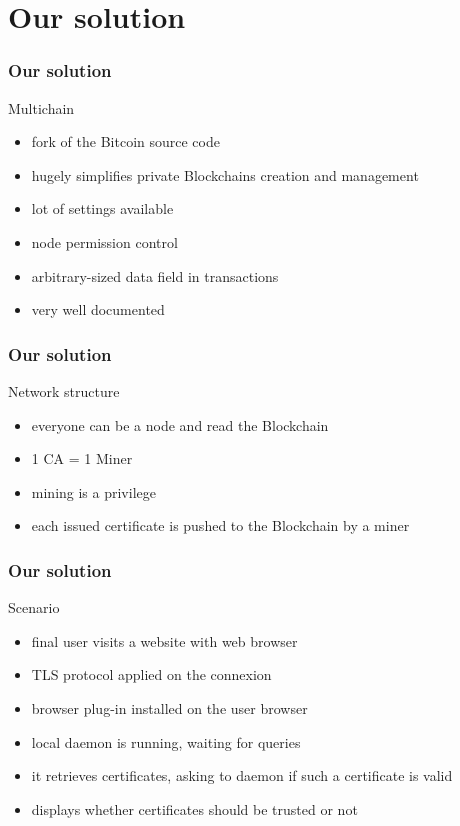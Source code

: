 \section[Our solution]{Our solution}
\begin{frame}
\frametitle{Our solution}
\begin{alertblock}{Multichain}
	\begin{itemize}
		\item fork of the Bitcoin source code
		\item hugely simplifies private Blockchains creation and management
		\item lot of settings available
		\item node permission control
		\item arbitrary-sized data field in transactions
		\item very well documented
	\end{itemize}
\end{alertblock}
\end{frame}

\begin{frame}
	\frametitle{Our solution}
	\begin{exampleblock}{Network structure}
		\begin{itemize}
			\item everyone can be a node and read the Blockchain
			\item 1 CA = 1 Miner
			\item mining is a privilege
			\item each issued certificate is pushed to the Blockchain by a miner
		\end{itemize}
	\end{exampleblock}
\end{frame}

\begin{frame}
	\frametitle{Our solution}
	\begin{alertblock}{Scenario}
		\begin{itemize}
			\item final user visits a website with web browser
			\item TLS protocol applied on the connexion
			\item browser plug-in installed on the user browser
			\item local daemon is running, waiting for queries
			\item it retrieves certificates, asking to daemon if such a certificate is valid
			\item displays whether certificates should be trusted or not
		\end{itemize}
	\end{alertblock}
\end{frame}